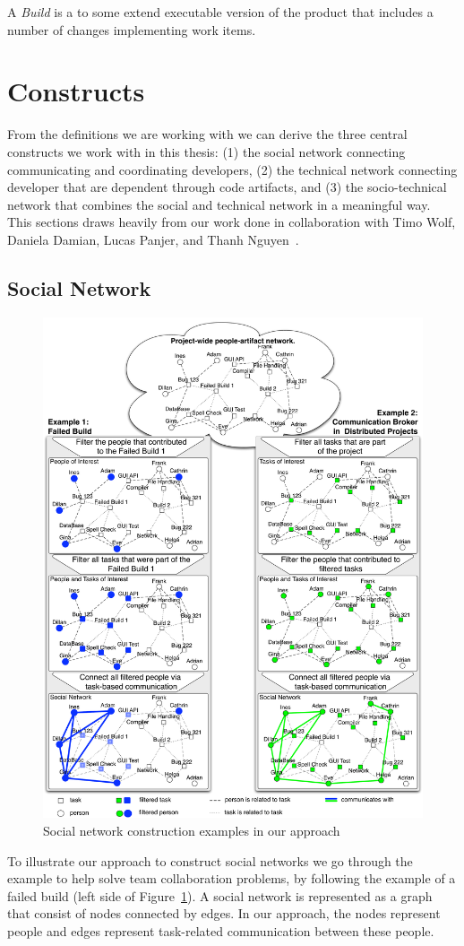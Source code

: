 \begin{note}
\begin{mydef}
A \emph{Build} is a to some extend executable version of the product that includes a number of changes implementing work items.
\end{mydef}
\end{note}

\section{Constructs}
\label{c5:sec:constructs}
From the definitions we are working with we can derive the three central constructs we work with in this thesis: (1) the social network connecting communicating and coordinating developers, (2) the technical network connecting developer that are dependent through code artifacts, and (3) the socio-technical network that combines the social and technical network in a meaningful way.
This sections draws heavily from our work done in collaboration with Timo Wolf, Daniela Damian, Lucas Panjer, and Thanh Nguyen~\cite{wolf:ieee:2009}.

\subsection{Social Network}
\begin{figure}[t!]
\begin{center}
\includegraphics[height=1\textwidth]{./figures/grand_figure}
\caption{Social network construction examples in our approach}
\label{fig:network}
\end{center}
\end{figure}
To illustrate our approach to construct social networks we go through the example to help solve team collaboration problems, by following the example of a failed build (left side of Figure~\ref{fig:network}). 
A social network is represented as a graph that consist of nodes connected by edges. 
In our approach, the nodes represent people and edges represent task-related communication between these people.


